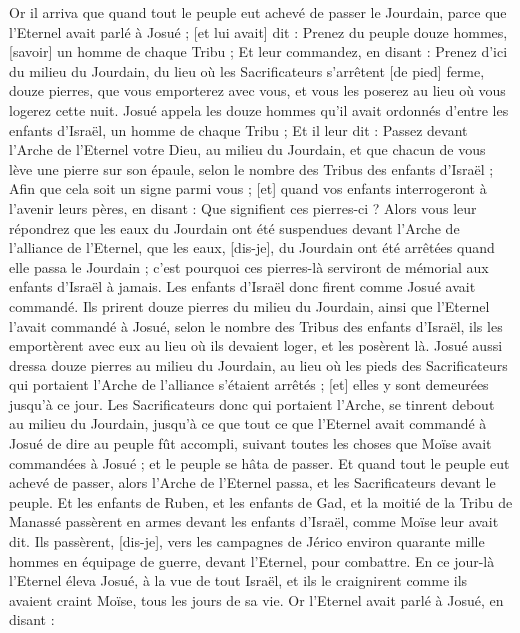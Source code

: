 \begin{multicols}{2}
\VerseOne{}Or il arriva que quand tout le peuple eut achevé de passer le Jourdain, parce que l'Eternel avait parlé à Josué ; [et lui avait] dit :
Prenez du peuple douze hommes, [savoir] un homme de chaque Tribu ;
Et leur commandez, en disant : Prenez d'ici du milieu du Jourdain, du lieu où les Sacrificateurs s'arrêtent [de pied] ferme, douze pierres, que vous emporterez avec vous, et vous les poserez au lieu où vous logerez cette nuit.
Josué appela les douze hommes qu'il avait ordonnés d'entre les enfants d'Israël, un homme de chaque Tribu ;
Et il leur dit : Passez devant l'Arche de l'Eternel votre Dieu, au milieu du Jourdain, et que chacun de vous lève une pierre sur son épaule, selon le nombre des Tribus des enfants d'Israël ;
Afin que cela soit un signe parmi vous ; [et] quand vos enfants interrogeront à l'avenir leurs pères, en disant : Que signifient ces pierres-ci ?
Alors vous leur répondrez que les eaux du Jourdain ont été suspendues devant l'Arche de l'alliance de l'Eternel, que les eaux, [dis-je], du Jourdain ont été arrêtées quand elle passa le Jourdain ; c'est pourquoi ces pierres-là serviront de mémorial aux enfants d'Israël à jamais.
Les enfants d'Israël donc firent comme Josué avait commandé. Ils prirent douze pierres du milieu du Jourdain, ainsi que l'Eternel l'avait commandé à Josué, selon le nombre des Tribus des enfants d'Israël, ils les emportèrent avec eux au lieu où ils devaient loger, et les posèrent là.
Josué aussi dressa douze pierres au milieu du Jourdain, au lieu où les pieds des Sacrificateurs qui portaient l'Arche de l'alliance s'étaient arrêtés ; [et] elles y sont demeurées jusqu'à ce jour.
Les Sacrificateurs donc qui portaient l'Arche, se tinrent debout au milieu du Jourdain, jusqu'à ce que tout ce que l'Eternel avait commandé à Josué de dire au peuple fût accompli, suivant toutes les choses que Moïse avait commandées à Josué ; et le peuple se hâta de passer.
Et quand tout le peuple eut achevé de passer, alors l'Arche de l'Eternel passa, et les Sacrificateurs devant le peuple.
Et les enfants de Ruben, et les enfants de Gad, et la moitié de la Tribu de Manassé passèrent en armes devant les enfants d'Israël, comme Moïse leur avait dit.
Ils passèrent, [dis-je], vers les campagnes de Jérico environ quarante mille hommes en équipage de guerre, devant l'Eternel, pour combattre.
En ce jour-là l'Eternel éleva Josué, à la vue de tout Israël, et ils le craignirent comme ils avaient craint Moïse, tous les jours de sa vie.
Or l'Eternel avait parlé à Josué, en disant :

\end{multicols}
